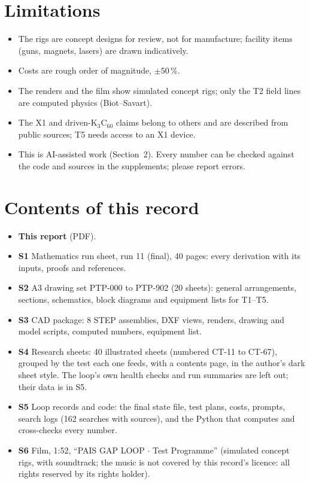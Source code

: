 \documentclass[10.5pt,a4paper]{article}
\newcommand{\Kc}{K$_3$C$_{60}$}
\begin{document}
\section{Limitations}
\begin{itemize}
\item The rigs are concept designs for review, not for manufacture; facility items (guns, magnets, lasers) are drawn indicatively.
\item Costs are rough order of magnitude, $\pm50\,\%$.
\item The renders and the film show simulated concept rigs; only the T2 field lines are computed physics (Biot--Savart).
\item The X1 and driven-\Kc{} claims belong to others and are described from public sources; T5 needs access to an X1 device.
\item This is AI-assisted work (Section~2). Every number can be checked against the code and sources in the supplements; please report errors.
\end{itemize}

\section{Contents of this record}
\begin{itemize}
\item \textbf{This report} (PDF).
\item \textbf{S1} Mathematics run sheet, run 11 (final), 40 pages: every derivation with its inputs, proofs and references.
\item \textbf{S2} A3 drawing set PTP-000 to PTP-902 (20 sheets): general arrangements, sections, schematics, block diagrams and equipment lists for T1--T5.
\item \textbf{S3} CAD package: 8 STEP assemblies, DXF views, renders, drawing and model scripts, computed numbers, equipment list.
\item \textbf{S4} Research sheets: 40 illustrated sheets (numbered CT-11 to CT-67), grouped by the test each one feeds, with a contents page, in the author's dark sheet style. The loop's own health checks and run summaries are left out; their data is in S5.
\item \textbf{S5} Loop records and code: the final state file, test plans, costs, prompts, search logs (162 searches with sources), and the Python that computes and cross-checks every number.
\item \textbf{S6} Film, 1:52, ``PAIS GAP LOOP $\cdot$ Test Programme'' (simulated concept rigs, with soundtrack; the music is not covered by this record's licence: all rights reserved by its rights holder).
\end{itemize}
\end{document}
